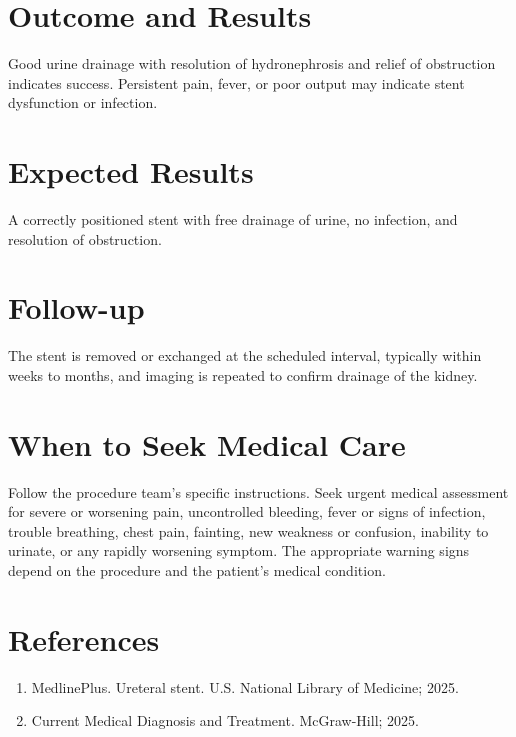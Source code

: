 \section*{Outcome and Results}
Good urine drainage with resolution of hydronephrosis and relief of obstruction indicates success. Persistent pain, fever, or poor output may indicate stent dysfunction or infection.
\section*{Expected Results}
A correctly positioned stent with free drainage of urine, no infection, and resolution of obstruction.
\section*{Follow-up}
The stent is removed or exchanged at the scheduled interval, typically within weeks to months, and imaging is repeated to confirm drainage of the kidney.
\section*{When to Seek Medical Care}
Follow the procedure team's specific instructions. Seek urgent medical assessment for severe or worsening pain, uncontrolled bleeding, fever or signs of infection, trouble breathing, chest pain, fainting, new weakness or confusion, inability to urinate, or any rapidly worsening symptom. The appropriate warning signs depend on the procedure and the patient's medical condition.

\section*{References}
\begin{enumerate}
  \item MedlinePlus. Ureteral stent. U.S. National Library of Medicine; 2025.
  \item Current Medical Diagnosis and Treatment. McGraw-Hill; 2025.
\end{enumerate}

\clearpage
